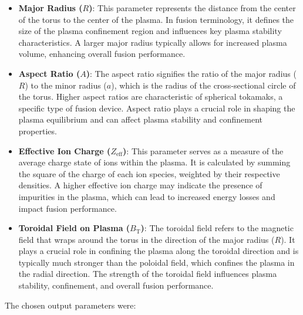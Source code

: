 \documentclass[journal]{IEEEtran}
\begin{document}
\begin{itemize}
    \item \textbf{Major Radius ($R$)}: This parameter represents the distance from the center of the torus to the center of the plasma. In fusion terminology, it defines the size of the plasma confinement region and influences key plasma stability characteristics. A larger major radius typically allows for increased plasma volume, enhancing overall fusion performance. 
    \item \textbf{Aspect Ratio ($A$)}: The aspect ratio signifies the ratio of the major radius ($R$) to the minor radius ($a$), which is the radius of the cross-sectional circle of the torus. Higher aspect ratios are characteristic of spherical tokamaks, a specific type of fusion device. Aspect ratio plays a crucial role in shaping the plasma equilibrium and can affect plasma stability and confinement properties. 
    \item \textbf{Effective Ion Charge ($Z_{\text{eff}}$)}: This parameter serves as a measure of the average charge state of ions within the plasma. It is calculated by summing the square of the charge of each ion species, weighted by their respective densities. A higher effective ion charge may indicate the presence of impurities in the plasma, which can lead to increased energy losses and impact fusion performance. 
    \item \textbf{Toroidal Field on Plasma ($B_{\text{T}}$)}: The toroidal field refers to the magnetic field that wraps around the torus in the direction of the major radius ($R$). It plays a crucial role in confining the plasma along the toroidal direction and is typically much stronger than the poloidal field, which confines the plasma in the radial direction. The strength of the toroidal field influences plasma stability, confinement, and overall fusion performance.
\end{itemize}

The chosen output parameters were:
\end{document}
